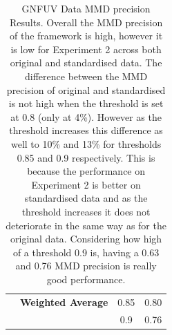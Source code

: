 \documentclass{mpaper}
\begin{document}
\begin{table}[]
\begin{tabular}{|c|ccc|}
                                                  & \multicolumn{1}{c|}{\textbf{Weighted Average}} & \multicolumn{1}{c|}{0.85}               & 0.80               \\
                                                  & \multicolumn{1}{c|}{}                          & \multicolumn{1}{c|}{0.9}                & 0.76               \\ \hline
\end{tabular}
\caption{\label{tab:gnfuv_mmd_precision} GNFUV Data MMD precision Results. Overall the MMD precision of the framework is high, however it is low for Experiment 2 across both original and standardised data. The difference between the MMD precision of original and standardised is not high when the threshold is set at 0.8 (only at 4\%). However as the threshold increases this difference as well to 10\% and 13\% for thresholds 0.85 and 0.9 respectively. This is because the performance on Experiment 2 is better on standardised data and as the threshold increases it does not deteriorate in the same way as for the original data. Considering how high of a threshold 0.9 is, having a 0.63 and 0.76 MMD precision is really good performance.}
\end{table}
\end{document}
